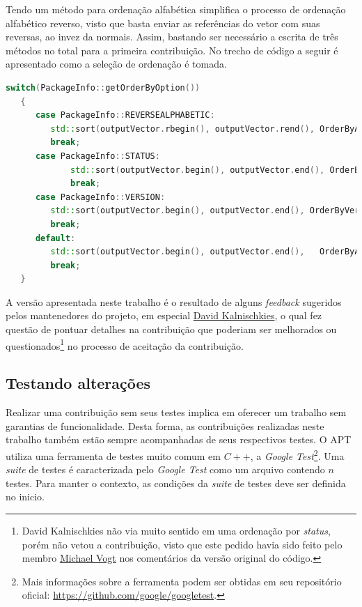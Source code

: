 Tendo um método para ordenação alfabética simplifica o processo de ordenação alfabético reverso, visto que basta enviar as referências do vetor com suas reversas, ao invez da normais. Assim, bastando ser necessário a escrita de três métodos no total para a primeira contribuição. No trecho de código a seguir é apresentado como a seleção de ordenação é tomada.


\begin{lstlisting}[language=C++,label=choose_pr1,caption={Tomada de decisão de ordenação}]
   switch(PackageInfo::getOrderByOption())
   {
      case PackageInfo::REVERSEALPHABETIC:
		 std::sort(outputVector.rbegin(), outputVector.rend(), OrderByAlphabetic);
		 break;
      case PackageInfo::STATUS:
			 std::sort(outputVector.begin(), outputVector.end(), OrderByStatus);
			 break;
      case PackageInfo::VERSION:
		 std::sort(outputVector.begin(), outputVector.end(), OrderByVersion);
		 break;
      default:
		 std::sort(outputVector.begin(), outputVector.end(),   OrderByAlphabetic);
		 break;
   }
\end{lstlisting}

A versão apresentada neste trabalho é o resultado de alguns \textit{feedback} sugeridos pelos mantenedores do projeto, em especial \href{https://github.com/DonKult}{David Kalnischkies}, o qual fez questão de pontuar detalhes na contribuição que poderiam ser melhorados ou questionados\footnote{David Kalnischkies não via muito sentido em uma ordenação por \textit{status}, porém não vetou a contribuição, visto que este pedido havia sido feito pelo membro \href{https://github.com/mvo5}{Michael Vogt} nos comentários da versão original do código.} no processo de aceitação da contribuição.


\subsection*{Testando alterações} %

Realizar uma contribuição sem seus testes implica em oferecer um trabalho sem garantias de funcionalidade. Desta forma, as contribuições realizadas neste trabalho também estão sempre acompanhadas de seus respectivos testes. O APT utiliza uma ferramenta de testes muito comum em $C++$, a \textit{Google Test}\footnote{Mais informações sobre a ferramenta podem ser obtidas em seu repositório oficial: \url{https://github.com/google/googletest}.}. Uma \textit{suite} de testes é caracterizada pelo \textit{Google Test} como um arquivo contendo $n$ testes. Para manter o contexto, as condições da \textit{suite} de testes deve ser definida no inicio.

